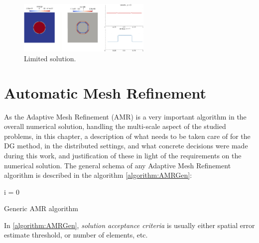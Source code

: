 \documentclass[journal,transmag]{IEEEtran}
\begin{document}
\begin{figure}[!t]
		\begin{center}
			\includegraphics[width=2.5in]{l1.jpg}
		\caption{Limited solution.}
		\label{figure:limited}
		\end{center}
	\end{figure}
	
\section{Automatic Mesh Refinement}
As the Adaptive Mesh Refinement (AMR) is a very important algorithm in the overall numerical solution, handling the multi-scale aspect of the studied problems, in this chapter, a description of what needs to be taken care of for the DG method, in the distributed settings, and what concrete decisions were made during this work, and justification of these in light of the requirements on the numerical solution.
The general schema of any Adaptive Mesh Refinement algorithm is described in the algorithm \ref{algorithm:AMRGen}:
\ \\
\begin{algorithm}
 i = 0\\
 \caption{Generic AMR algorithm}
\label{algorithm:AMRGen}
\end{algorithm}
In \ref{algorithm:AMRGen}, \textit{solution acceptance criteria} is usually either spatial error estimate threshold, or number of elements, etc.
\end{document}
